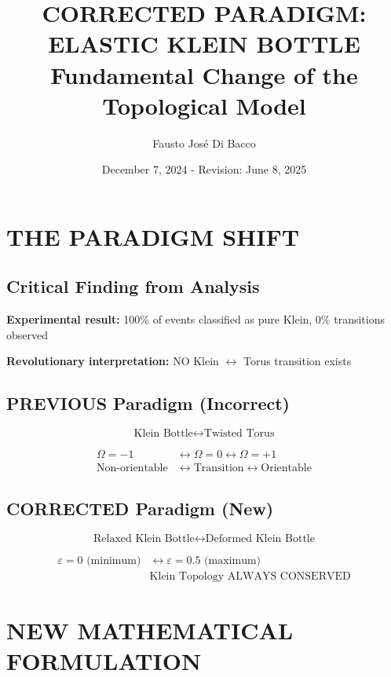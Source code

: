\documentclass[12pt,a4paper]{article}
\title{\Large \textbf{CORRECTED PARADIGM: ELASTIC KLEIN BOTTLE}\\
\large Fundamental Change of the Topological Model}
\author{Fausto José Di Bacco}
\date{December 7, 2024 - Revision: June 8, 2025}
\begin{document}
\maketitle

\section{THE PARADIGM SHIFT}

\subsection{Critical Finding from Analysis}

\textbf{Experimental result:} 100\% of events classified as pure Klein, 0\% transitions observed

\textbf{Revolutionary interpretation:} NO Klein $\leftrightarrow$ Torus transition exists

\subsection{PREVIOUS Paradigm (Incorrect)}

\begin{equation}
\text{Klein Bottle} \leftrightarrow \text{Twisted Torus}
\end{equation}

\begin{align}
\Omega = -1 &\leftrightarrow \Omega = 0 \leftrightarrow \Omega = +1\\
\text{Non-orientable} &\leftrightarrow \text{Transition} \leftrightarrow \text{Orientable}
\end{align}

\subsection{CORRECTED Paradigm (New)}

\begin{equation}
\text{Relaxed Klein Bottle} \leftrightarrow \text{Deformed Klein Bottle}
\end{equation}

\begin{align}
\varepsilon = 0 \text{ (minimum)} &\leftrightarrow \varepsilon = 0.5 \text{ (maximum)}\\
&\text{Klein Topology ALWAYS CONSERVED}
\end{align}

\section{NEW MATHEMATICAL FORMULATION}
\end{document}
